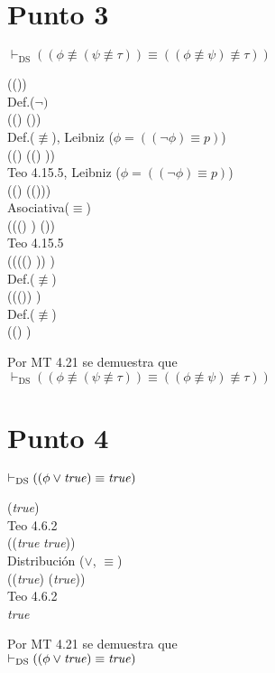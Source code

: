 \documentclass{article}
\begin{document}
\section{Punto 3}
\begin{logicenv}{$\vdash_{\text{DS}} ((\phi \not\equiv (\psi \not\equiv \tau)) \equiv ((\phi \not\equiv \psi) \not\equiv \tau))$}
    \begin{derivation}
            (\phi \not\equiv (\psi \not\equiv \tau))\\
            Def.($\neg)$\\
            ((\neg \phi) \equiv (\psi \not\equiv \tau))\\
            Def.($\not\equiv$), Leibniz ($\phi = ((\neg \phi) \equiv p)$)\\
            ((\neg \phi) \equiv ((\neg \psi) \equiv \tau))\\
            Teo 4.15.5, Leibniz ($\phi = ((\neg \phi) \equiv p)$)\\
            ((\neg \phi) \equiv (\psi \equiv (\neg \tau)))\\
            Asociativa($\equiv$)\\
            (((\neg \phi) \equiv \psi) \equiv (\neg \tau))\\
            Teo 4.15.5\\
            ((\neg ((\neg \phi) \equiv \psi)) \equiv \tau)\\
            Def.($\not\equiv$)\\
            ((\neg (\phi \not\equiv \psi)) \equiv \tau)\\
            Def.($\not\equiv$)\\
            ((\phi \not\equiv \psi) \not\equiv \tau)
    \end{derivation}
    Por MT 4.21 se demuestra que\\
    $\vdash_{\text{DS}} ((\phi \not\equiv (\psi \not\equiv \tau)) \equiv ((\phi \not\equiv \psi) \not\equiv \tau))$
\end{logicenv}

\section{Punto 4}
\begin{logicenv}{$\vdash_{\text{DS}} ((\phi \lor \textrm{\textit{true}}) \equiv \textrm{\textit{true}})$}
    \begin{derivation}
        (\phi \lor \textrm{\textit{true}})\\
        Teo 4.6.2\\
        (\phi \lor (\textrm{\textit{true}} \equiv \textrm{\textit{true}}))\\
        Distribución ($\lor$, $\equiv$)\\
        ((\phi \lor \textrm{\textit{true}}) \equiv (\phi \lor \textrm{\textit{true}}))\\
        Teo 4.6.2\\
        \textrm{\textit{true}}
    \end{derivation}
    Por MT 4.21 se demuestra que\\
    $\vdash_{\text{DS}} ((\phi \lor \textrm{\textit{true}}) \equiv \textrm{\textit{true}})$
\end{logicenv}
\end{document}

